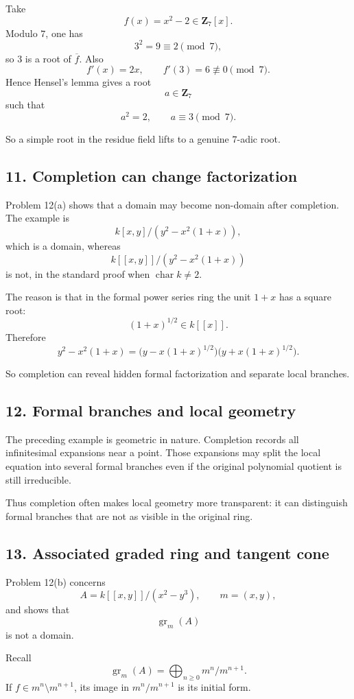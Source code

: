 \documentclass[12pt,a4paper]{article}
\theoremstyle{plain}
\theoremstyle{definition}      %
\begin{document}
	Take
	\[
	f(x)=x^2-2\in \mathbf Z_7[x].
	\]
	Modulo \(7\), one has
	\[
	3^2=9\equiv 2 \pmod 7,
	\]
	so \(3\) is a root of \(\overline f\). Also
	\[
	f'(x)=2x,\qquad f'(3)=6\not\equiv 0\pmod 7.
	\]
	Hence Hensel's lemma gives a root
	\[
	a\in \mathbf Z_7
	\]
	such that
	\[
	a^2=2,\qquad a\equiv 3\pmod 7.
	\]
	
	So a simple root in the residue field lifts to a genuine \(7\)-adic root.
	
	\subsection*{11. Completion can change factorization}
	
	Problem 12(a) shows that a domain may become non-domain after completion. The example is
	\[
	k[x,y]/(y^2-x^2(1+x)),
	\]
	which is a domain, whereas
	\[
	k[[x,y]]/(y^2-x^2(1+x))
	\]
	is not, in the standard proof when \(\operatorname{char}k\neq 2\).
	
	The reason is that in the formal power series ring the unit \(1+x\) has a square root:
	\[
	(1+x)^{1/2}\in k[[x]].
	\]
	Therefore
	\[
	y^2-x^2(1+x)
	=
	\bigl(y-x(1+x)^{1/2}\bigr)\bigl(y+x(1+x)^{1/2}\bigr).
	\]
	
	So completion can reveal hidden formal factorization and separate local branches.
	
	\subsection*{12. Formal branches and local geometry}
	
	The preceding example is geometric in nature. Completion records all infinitesimal expansions near a point. Those expansions may split the local equation into several formal branches even if the original polynomial quotient is still irreducible.
	
	Thus completion often makes local geometry more transparent: it can distinguish formal branches that are not as visible in the original ring.
	
	\subsection*{13. Associated graded ring and tangent cone}
	
	Problem 12(b) concerns
	\[
	A=k[[x,y]]/(x^2-y^3),\qquad m=(x,y),
	\]
	and shows that
	\[
	\operatorname{gr}_m(A)
	\]
	is not a domain.
	
	Recall
	\[
	\operatorname{gr}_m(A)=\bigoplus_{n\ge0} m^n/m^{n+1}.
	\]
	If \(f\in m^n\setminus m^{n+1}\), its image in \(m^n/m^{n+1}\) is its initial form.
	
\end{document}
